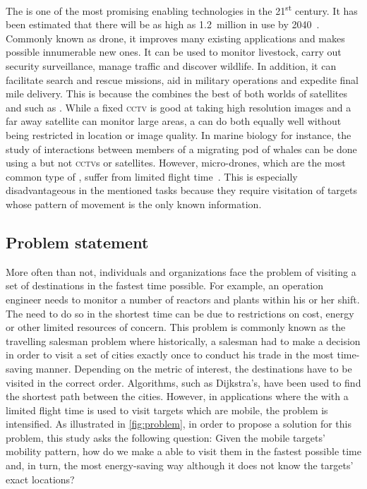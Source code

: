 \documentclass[../main.tex]{subfiles}
\begin{document}
The \uav is one of the most promising enabling technologies in the 
21\textsuperscript{st} century. It has been estimated that
there will be as high as \SI{1.2}{million} \uavs in use 
by 2040~\cite{Amo19}. 
Commonly known as drone, 
it improves many existing applications and makes possible 
innumerable new ones. It can be used to monitor livestock, 
carry out security surveillance, manage traffic 
and discover wildlife.
In addition, it can facilitate search and rescue missions,
aid in military operations and expedite final mile delivery.
This is because the \uav combines the best of both worlds
of satellites and \csns such as \cctvs.
While a fixed \textsc{cctv} is good at taking 
high resolution images and a far away satellite can monitor
large areas, a \uav can do both equally well without 
being restricted in location or image quality. 
In marine biology for instance,  
the study of interactions between members of a migrating 
pod of whales can be done using a \uav but not 
\textsc{cctv}s or satellites.
However, micro-drones, which are the most common type of \uavs,
suffer from limited flight time~\cite{Sha19}. 
This is especially disadvantageous in
the mentioned tasks because they require visitation of targets
whose pattern of movement is the only known information.

\subsection{Problem statement}

More often than not, individuals and organizations face the problem
of visiting a set of destinations in the fastest time 
possible.
For example, an operation engineer needs to monitor
a number of reactors and plants within his or her shift.
The need to do so in the shortest time can be due to restrictions on
cost, energy or other limited resources of concern.
This problem is commonly known as the travelling salesman problem
where historically, a salesman had to make a decision in order
to visit a set of cities exactly once to conduct his trade
in the most time-saving manner.
Depending on the metric of interest, 
the destinations have to be visited in the correct order.
Algorithms, such as Dijkstra's, have been used 
to find the shortest path between the cities.
However, in applications where the \uav with a limited
flight time is used to 
visit targets which are mobile, the problem is intensified.
As illustrated in \cref{fig:problem}, in order to propose a solution for this problem, this study asks the following question: 
Given the mobile targets' mobility pattern,
how do we make a \uav able to visit them
in the fastest possible time and, in turn, 
the most energy-saving way although it does not know the targets'
exact locations?  
\end{document}
